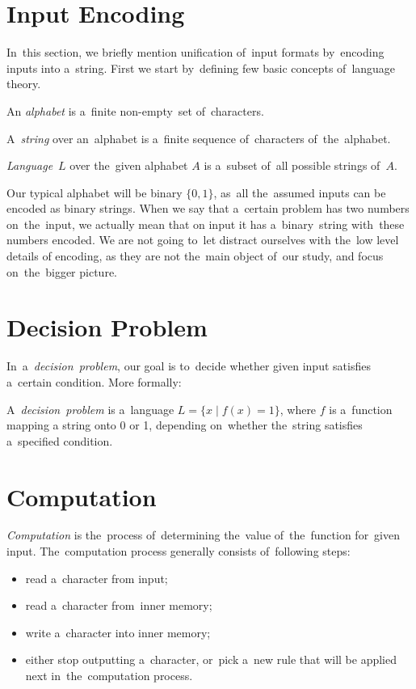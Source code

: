\section{Input Encoding}
In~this section, we briefly mention unification of~input formats by~encoding inputs into a~string.
First we start by~defining few basic concepts of~language theory.
\begin{definition}[Alphabet]
    An \emph{alphabet} is a~finite non-empty~set of~characters.
\end{definition}
\begin{definition}[String]
    A~\emph{string} over an~alphabet is a~finite sequence of~characters of~the~alphabet.
\end{definition}
\begin{definition}[Language]
    \emph{Language}~$L$ over the~given alphabet $A$ is a~subset of~all possible strings of~$A$.
\end{definition}
Our typical alphabet will be binary $\{0, 1\}$, as~all the~assumed inputs can be encoded as binary strings. When we say that a~certain problem has two numbers on~the~input, we actually mean that on input it has a~binary~string with~these numbers encoded. We are not going to~let distract ourselves with the~low level details of encoding, as they are not the~main object of~our study, and focus on~the~bigger picture.
\section{Decision Problem}
In~a~\textit{decision~problem}, our goal is to~decide whether given input satisfies a~certain condition. More formally:
\begin{definition}
    A~\emph{decision~problem} is a~language $L = \{x \mid f(x) = 1\}$, where $f$ is a~function mapping a string onto 0 or 1, depending on~whether the~string satisfies a~specified condition.
\end{definition}
\section{Computation}
\textit{Computation} is the~process of~determining the~value of~the~function for~given input. The~computation process generally consists of~following steps:
\begin{itemize}
    \item read a~character from input;
    \item read a~character from~inner memory;
    \item write a~character into inner memory;
    \item either stop outputting a~character, or~pick a~new rule that will be applied next in~the~computation process.
\end{itemize}
